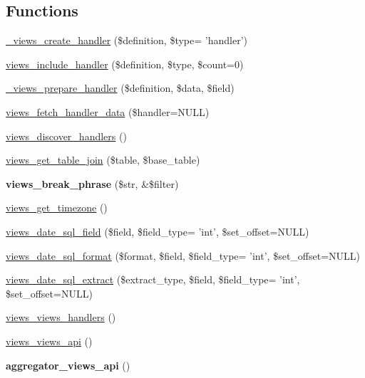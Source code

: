 \subsection*{Functions}
\begin{CompactItemize}
\item 
\hyperlink{handlers_8inc_77557bf731e44c2951aa8f0c1253b4ae}{\_\-views\_\-create\_\-handler} (\$definition, \$type= 'handler')
\item 
\hyperlink{handlers_8inc_275561b03251609d3a86de094f4cac9a}{views\_\-include\_\-handler} (\$definition, \$type, \$count=0)
\item 
\hyperlink{handlers_8inc_8e2fd3af54882a8c2b654769a89a612e}{\_\-views\_\-prepare\_\-handler} (\$definition, \$data, \$field)
\item 
\hyperlink{handlers_8inc_507fd16f1a3635bf959aaf54fef06cef}{views\_\-fetch\_\-handler\_\-data} (\$handler=NULL)
\item 
\hyperlink{handlers_8inc_5723616d83060c0a1e13d8e8f37c948d}{views\_\-discover\_\-handlers} ()
\item 
\hyperlink{handlers_8inc_76ba5af63134db1102702696a50ba6f5}{views\_\-get\_\-table\_\-join} (\$table, \$base\_\-table)
\item 
\hypertarget{handlers_8inc_45d0aa176d5e6a6b5e7a0de47cfb5893}{
\textbf{views\_\-break\_\-phrase} (\$str, \&\$filter)}
\label{handlers_8inc_45d0aa176d5e6a6b5e7a0de47cfb5893}

\item 
\hyperlink{handlers_8inc_3bd8b0bf769dc6d068349b222edb410c}{views\_\-get\_\-timezone} ()
\item 
\hyperlink{handlers_8inc_e61b1af2423ecd6df2332d716f980234}{views\_\-date\_\-sql\_\-field} (\$field, \$field\_\-type= 'int', \$set\_\-offset=NULL)
\item 
\hyperlink{handlers_8inc_7916ceb65f4cbc07601e2acae923374e}{views\_\-date\_\-sql\_\-format} (\$format, \$field, \$field\_\-type= 'int', \$set\_\-offset=NULL)
\item 
\hyperlink{handlers_8inc_dd4a1d7bb4ea764872603f9f56afaab1}{views\_\-date\_\-sql\_\-extract} (\$extract\_\-type, \$field, \$field\_\-type= 'int', \$set\_\-offset=NULL)
\item 
\hyperlink{handlers_8inc_aa860496d6ea85a62caa4e23557e55fa}{views\_\-views\_\-handlers} ()
\item 
\hyperlink{handlers_8inc_907c76d0314986d60f7e2361243eaa5d}{views\_\-views\_\-api} ()
\item 
\hypertarget{handlers_8inc_20d9b5f8e269c04dab0a14301c99b1f0}{
\textbf{aggregator\_\-views\_\-api} ()}
\label{handlers_8inc_20d9b5f8e269c04dab0a14301c99b1f0}


\end{CompactItemize}
